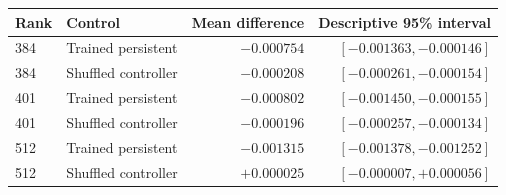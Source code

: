 \begin{tabular}{llrr}
\toprule
Rank & Control & Mean difference & Descriptive 95\% interval \\
\midrule
384 & Trained persistent & $-0.000754$ & $[-0.001363,-0.000146]$ \\
384 & Shuffled controller & $-0.000208$ & $[-0.000261,-0.000154]$ \\
401 & Trained persistent & $-0.000802$ & $[-0.001450,-0.000155]$ \\
401 & Shuffled controller & $-0.000196$ & $[-0.000257,-0.000134]$ \\
512 & Trained persistent & $-0.001315$ & $[-0.001378,-0.001252]$ \\
512 & Shuffled controller & $+0.000025$ & $[-0.000007,+0.000056]$ \\
\bottomrule
\end{tabular}
